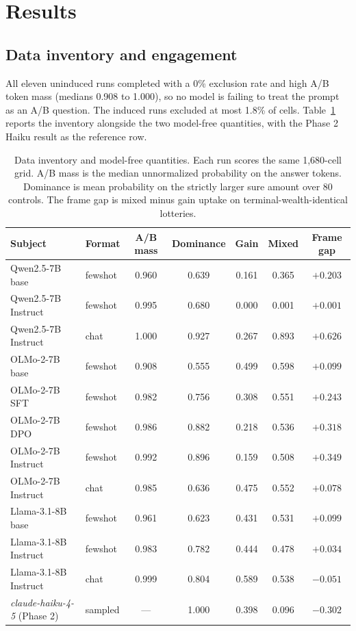 \documentclass[11pt]{article}
\begin{document}
\section{Results}

\subsection{Data inventory and engagement}
All eleven uninduced runs completed with a 0\% exclusion rate and high A/B token mass (medians 0.908 to
1.000), so no model is failing to treat the prompt as an A/B question. The induced runs excluded at most
1.8\% of cells. Table~\ref{tab:inventory} reports the inventory alongside the two model-free quantities,
with the Phase 2 Haiku result as the reference row.

\begin{table}[h]
\centering
\caption{Data inventory and model-free quantities. Each run scores the same 1{,}680-cell grid. A/B mass
is the median unnormalized probability on the answer tokens. Dominance is mean probability on the
strictly larger sure amount over 80 controls. The frame gap is mixed minus gain uptake on
terminal-wealth-identical lotteries.}
\label{tab:inventory}
\begin{tabular}{@{}llccccc@{}}
\toprule
Subject & Format & A/B mass & Dominance & Gain & Mixed & Frame gap \\
\midrule
Qwen2.5-7B base        & fewshot & 0.960 & 0.639 & 0.161 & 0.365 & $+0.203$ \\
Qwen2.5-7B Instruct    & fewshot & 0.995 & 0.680 & 0.000 & 0.001 & $+0.001$ \\
Qwen2.5-7B Instruct    & chat    & 1.000 & 0.927 & 0.267 & 0.893 & $+0.626$ \\
\addlinespace
OLMo-2-7B base         & fewshot & 0.908 & 0.555 & 0.499 & 0.598 & $+0.099$ \\
OLMo-2-7B SFT          & fewshot & 0.982 & 0.756 & 0.308 & 0.551 & $+0.243$ \\
OLMo-2-7B DPO          & fewshot & 0.986 & 0.882 & 0.218 & 0.536 & $+0.318$ \\
OLMo-2-7B Instruct     & fewshot & 0.992 & 0.896 & 0.159 & 0.508 & $+0.349$ \\
OLMo-2-7B Instruct     & chat    & 0.985 & 0.636 & 0.475 & 0.552 & $+0.078$ \\
\addlinespace
Llama-3.1-8B base      & fewshot & 0.961 & 0.623 & 0.431 & 0.531 & $+0.099$ \\
Llama-3.1-8B Instruct  & fewshot & 0.983 & 0.782 & 0.444 & 0.478 & $+0.034$ \\
Llama-3.1-8B Instruct  & chat    & 0.999 & 0.804 & 0.589 & 0.538 & $-0.051$ \\
\addlinespace
\textit{claude-haiku-4-5} (Phase 2) & sampled & --- & 1.000 & 0.398 & 0.096 & $-0.302$ \\
\bottomrule
\end{tabular}
\end{table}
\end{document}
